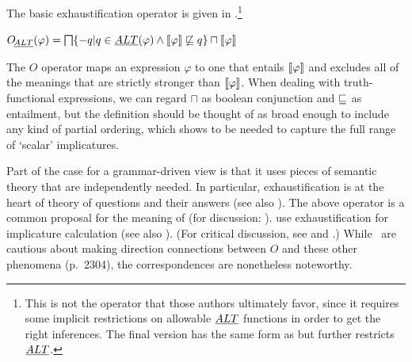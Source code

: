 \documentclass[leqno]{article}
\begin{document}
The basic exhaustification operator is given in 
\citep{Spector:2007,Fox:2007,Fox:2009,Magri:2009,ChierchiaFoxSpector08}.\footnote{This
  is not the operator that those authors ultimately favor, since it
  requires some implicit restrictions on allowable $\emph{ALT}$ functions in
  order to get the right inferences.  The final version has the same
  form as  but further restricts $\emph{ALT}$.}
%
\begin{examples}
\item\label{def:O}
 $\mathop{O\negthinspace_{\emph{ALT}}}(\varphi) = 
\bigsqcap \{ -q | q \in \emph{ALT}(\varphi) \wedge \llbracket\varphi\rrbracket \not\sqsubseteq q \} \sqcap \llbracket\varphi\rrbracket$ 
\end{examples}
%
The $O$ operator maps an expression $\varphi$ to one that entails
$\llbracket\varphi\rrbracket$ and excludes all of the meanings that are strictly
stronger than $\llbracket\varphi\rrbracket$. When dealing with truth-functional
expressions, we can regard $\sqcap$ as boolean conjunction and
$\sqsubseteq$ as entailment, but the definition should be thought of as
broad enough to include any kind of partial ordering, which
 shows to be needed to capture the full
range of `scalar' implicatures.

Part of the case for a grammar-driven view is that it uses pieces of
semantic theory that are independently needed. In particular,
exhaustification is at the heart of  theory
of questions and their answers (see also
\citealt{JohnMcCarthy80}). The above operator is a common proposal for
the meaning of  (for discussion:
\citealt{Rooth96,Buring01,BeaverClark08}).  \citet{SchulzVanRooij06}
use exhaustification for implicature calculation (see also
\citealt{deJagerVanRooij07}).  (For critical discussion, see
\citealt{Alonso-Ovalle:2008} and \citealt{Gajewski:2012}.) While \CFS\
are cautious about making direction connections between $O$ and these
other phenomena (p.~2304), the correspondences are nonetheless
noteworthy.
\end{document}

